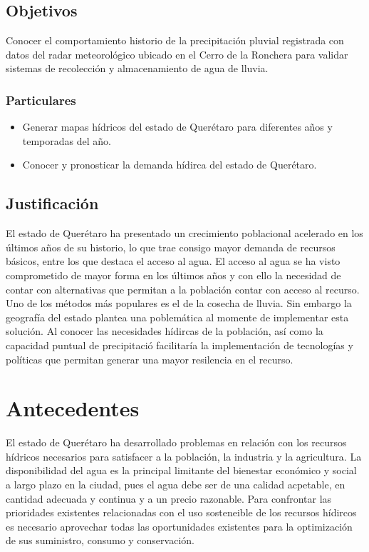 \documentclass[letterpaper,12pt,oneside]{book}
\begin{document}
    \section{Objetivos}
        Conocer el comportamiento historio de la precipitación pluvial registrada con datos del radar meteorológico ubicado en el Cerro de la Ronchera para validar sistemas de recolección y almacenamiento de agua de lluvia.
        \subsection{Particulares}
            \begin{itemize}
                \item Generar mapas hídricos del estado de Querétaro para diferentes años y temporadas del año.
                \item Conocer y pronosticar la demanda hídirca del estado de Querétaro.
            \end{itemize}

    \section{Justificación}
        El estado de Querétaro ha presentado un crecimiento poblacional acelerado en los últimos años de su historio, lo que trae consigo mayor demanda de recursos básicos, entre los que destaca el acceso al agua. 
        El acceso al agua se ha visto comprometido de mayor forma en los últimos años y con ello la necesidad de contar con alternativas que permitan a la población contar con acceso al recurso. Uno de los métodos más populares es el de la cosecha de lluvia. Sin embargo la geografía del estado plantea una poblemática al momente de implementar esta solución.
        Al conocer las necesidades hídircas de la población, así como la capacidad puntual de precipitació facilitaría la implementación de tecnologías y políticas que permitan generar una mayor resilencia en el recurso.


\tableofcontents

    
\mainmatter

\chapter{Antecedentes} 
    El estado de Querétaro ha desarrollado problemas en relación con los recursos hídricos necesarios para satisfacer a la población, la industria y la agricultura. La disponibilidad del agua es la principal limitante del bienestar económico y social a largo plazo en la ciudad, pues el agua debe ser de una calidad acpetable, en cantidad adecuada y continua y a un precio razonable. Para confrontar las prioridades existentes relacionadas con el uso sosteneible de los recursos hídircos es necesario aprovechar todas las oportunidades existentes para la optimización de sus suministro, consumo y conservación.
\end{document}
